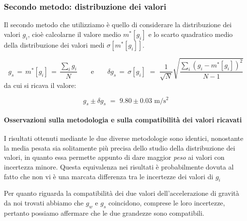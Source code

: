 \subsubsection{Secondo metodo: distribuzione dei valori}

Il secondo metodo che utilizziamo è quello di considerare la distribuzione dei valori $g_i$, cioè calcolarne il valore medio $m^*[g_i]$ e lo scarto quadratico medio della distribuzione dei valori medi $\sigma[m^*[g_i]]$.

\begin{equation*}
g_s \, = \, m^*[g_i] \, = \, \frac{\sum_i g_i}{N} \quad\quad \text{e} \quad\quad \delta g_s \, = \, \sigma[g_i] \,\, = \,\, \frac{1}{\sqrt{N}}\sqrt{\frac{\sum_i (g_i - m^*[g_i])^2}{N-1}}
\end{equation*}
%
da cui si ricava il valore:

\begin{equation}
g_s \pm \delta g_s \,\, = \,\, 9.80 \pm 0.03 \,\, \si{\metre\per\square\second}
\end{equation}

\paragraph{Osservazioni sulla metodologia e sulla compatibilità dei valori ricavati\\}

I risultati ottenuti mediante le due diverse metodologie sono identici, nonostante la media pesata sia solitamente più precisa dello studio della distribuzione dei valori, in quanto essa permette appunto di dare maggior \emph{peso} ai valori con incertezza minore. Questa equivalenza nei risultati è probabilmente dovuta al fatto che non vi è una marcata differenza tra le incertezze dei valori di $g_i$

Per quanto riguarda la compatibilità dei due valori dell'accelerazione di gravità da noi trovati abbiamo che $g_w$ e $g_s$ coincidono, comprese le loro incertezze, pertanto possiamo affermare che le due grandezze sono compatibili.


